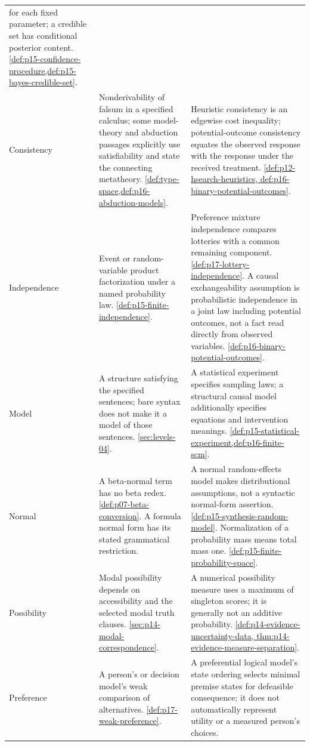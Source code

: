 \begin{longtable}{@{}p{}p{}p{}@{}}
for each fixed parameter; a credible set has conditional posterior content.
\cref{def:p15-confidence-procedure,def:p15-bayes-credible-set}. \\
Consistency & Nonderivability of falsum in a specified calculus; some
model-theory and abduction passages explicitly use satisfiability and state
the connecting metatheory. \cref{def:type-space,def:p16-abduction-models}. &
Heuristic consistency is an edgewise cost inequality; potential-outcome
consistency equates the observed response with the response under the
received treatment. \cref{def:p12-hsearch-heuristics,
def:p16-binary-potential-outcomes}. \\
Independence & Event or random-variable product factorization under a named
probability law. \cref{def:p15-finite-independence}. & Preference mixture
independence compares lotteries with a common remaining component.
\cref{def:p17-lottery-independence}. A causal exchangeability assumption is
probabilistic independence in a joint law including potential outcomes,
not a fact read directly from observed variables.
\cref{def:p16-binary-potential-outcomes}. \\
Model & A structure satisfying the specified sentences; bare syntax does
not make it a model of those sentences. \cref{sec:levels-04}. & A statistical
experiment specifies sampling laws; a structural causal model additionally
specifies equations and intervention meanings.
\cref{def:p15-statistical-experiment,def:p16-finite-scm}. \\
Normal & A beta-normal term has no beta redex. \cref{def:p07-beta-conversion}.
A formula normal form has its stated grammatical restriction. & A normal
random-effects model makes distributional assumptions, not a syntactic
normal-form assertion. \cref{def:p15-synthesis-random-model}.
Normalization of a probability mass means total mass one.
\cref{def:p15-finite-probability-space}. \\
Possibility & Modal possibility depends on accessibility and the selected
modal truth clauses. \cref{sec:p14-modal-correspondence}. & A numerical
possibility measure uses a maximum of singleton scores; it is generally
not an additive probability. \cref{def:p14-evidence-uncertainty-data,
thm:p14-evidence-measure-separation}. \\
Preference & A person's or decision model's weak comparison of alternatives.
\cref{def:p17-weak-preference}. & A preferential logical model's state ordering
selects minimal premise states for defeasible consequence; it does not
automatically represent utility or a measured person's choices.

\end{longtable}
